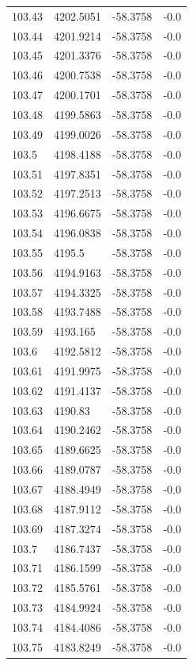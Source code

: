 \begin{table}[H]
\begin{tabular}{llll}
103.43 & 4202.5051 & -58.3758 & -0.0 \\
103.44 & 4201.9214 & -58.3758 & -0.0 \\
103.45 & 4201.3376 & -58.3758 & -0.0 \\
103.46 & 4200.7538 & -58.3758 & -0.0 \\
103.47 & 4200.1701 & -58.3758 & -0.0 \\
103.48 & 4199.5863 & -58.3758 & -0.0 \\
103.49 & 4199.0026 & -58.3758 & -0.0 \\
103.5 & 4198.4188 & -58.3758 & -0.0 \\
103.51 & 4197.8351 & -58.3758 & -0.0 \\
103.52 & 4197.2513 & -58.3758 & -0.0 \\
103.53 & 4196.6675 & -58.3758 & -0.0 \\
103.54 & 4196.0838 & -58.3758 & -0.0 \\
103.55 & 4195.5 & -58.3758 & -0.0 \\
103.56 & 4194.9163 & -58.3758 & -0.0 \\
103.57 & 4194.3325 & -58.3758 & -0.0 \\
103.58 & 4193.7488 & -58.3758 & -0.0 \\
103.59 & 4193.165 & -58.3758 & -0.0 \\
103.6 & 4192.5812 & -58.3758 & -0.0 \\
103.61 & 4191.9975 & -58.3758 & -0.0 \\
103.62 & 4191.4137 & -58.3758 & -0.0 \\
103.63 & 4190.83 & -58.3758 & -0.0 \\
103.64 & 4190.2462 & -58.3758 & -0.0 \\
103.65 & 4189.6625 & -58.3758 & -0.0 \\
103.66 & 4189.0787 & -58.3758 & -0.0 \\
103.67 & 4188.4949 & -58.3758 & -0.0 \\
103.68 & 4187.9112 & -58.3758 & -0.0 \\
103.69 & 4187.3274 & -58.3758 & -0.0 \\
103.7 & 4186.7437 & -58.3758 & -0.0 \\
103.71 & 4186.1599 & -58.3758 & -0.0 \\
103.72 & 4185.5761 & -58.3758 & -0.0 \\
103.73 & 4184.9924 & -58.3758 & -0.0 \\
103.74 & 4184.4086 & -58.3758 & -0.0 \\
103.75 & 4183.8249 & -58.3758 & -0.0 \\

\end{tabular}
\end{table}
